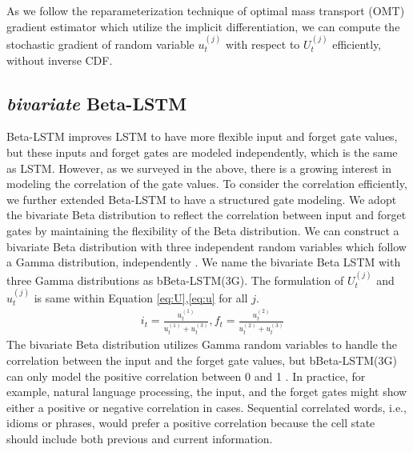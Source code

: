 \documentclass[letterpaper]{article} %
\begin{document}
As we follow the reparameterization technique of optimal mass transport (OMT) gradient estimator \cite{jankowiak2018pathwise} which utilize the implicit differentiation, we can compute the stochastic gradient of random variable $u_{t}^{(j)}$ with respect to $U_{t}^{(j)}$ efficiently, without inverse CDF.


\subsection{\textit{bivariate} Beta-LSTM}
Beta-LSTM improves LSTM to have more flexible input and forget gate values, but these inputs and forget gates are modeled independently, which is the same as LSTM. However, as we surveyed in the above, there is a growing interest in modeling the correlation of the gate values. To consider the correlation efficiently, we further extended Beta-LSTM to have a structured gate modeling. We adopt the bivariate Beta distribution to reflect the correlation between input and forget gates by maintaining the flexibility of the Beta distribution. We can construct a bivariate Beta distribution with three independent random variables which follow a Gamma distribution, independently \cite{OLKIN2003407}. We name the bivariate Beta LSTM with three Gamma distributions as bBeta-LSTM(3G). The formulation of $U_{t}^{(j)}$ and $u_{t}^{(j)}$ is same within Equation \ref{eq:U},\ref{eq:u} for all $j$.
\begin{align}
	&i_{t} = \frac{u_{t}^{(1)}}{u_{t}^{(1)}+u_{t}^{(3)}}, f_{t} = \frac{u_{t}^{(2)}}{u_{t}^{(2)}+u_{t}^{(3)}} \label{eq:3G_input_forget}
\end{align}
%
The bivariate Beta distribution utilizes Gamma random variables to handle the correlation between the input and the forget gate values, but bBeta-LSTM(3G) can only model the positive correlation between 0 and 1 \cite{OLKIN2003407}.
In practice, for example, natural language processing, the input, and the forget gates might show either a positive or negative correlation in cases. Sequential correlated words, i.e., idioms or phrases, would prefer a positive correlation because the cell state should include both previous and current information.
\end{document}
